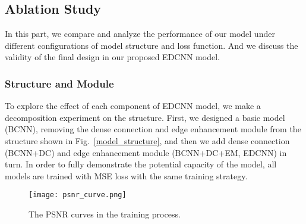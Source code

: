 \documentclass[conference]{IEEEtran}
\begin{document}
        \subsection{Ablation Study}
            In this part, we compare and analyze the performance of our model under different configurations of model structure and loss function.
            And we discuss the validity of the final design in our proposed EDCNN model.

            \medskip

            \subsubsection{Structure and Module}
                To explore the effect of each component of EDCNN model, we make a decomposition experiment on the structure. 
                First, we designed a basic model (BCNN), removing the dense connection and edge enhancement module from the structure shown in Fig.~\ref{model_structure}, and then we add dense connection (BCNN+DC) and edge enhancement module (BCNN+DC+EM, EDCNN) in turn.
                In order to fully demonstrate the potential capacity of the model, all models are trained with MSE loss with the same training strategy.

                \begin{figure}[h]
                    \texttt{[image: psnr\_curve.png]}
                    \caption{The PSNR curves in the training process.}
                    \label{psnr_curve}
                \end{figure}
\end{document}
